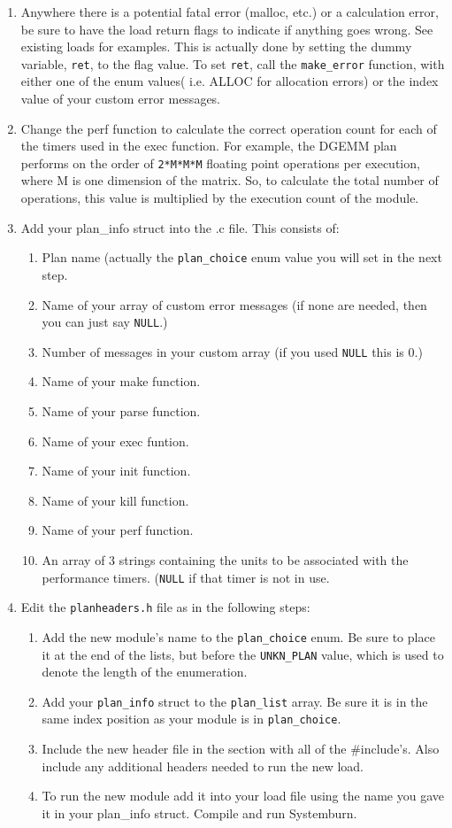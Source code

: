 \begin{enumerate}
        \item Anywhere there is a potential fatal error (malloc, etc.) or a calculation error, be sure to have the load return flags to indicate if anything goes wrong. See existing loads for examples. This is actually done by setting the dummy variable, \verb!ret!, to the flag value. To set \verb!ret!, call the \verb!make_error! function, with either one of the enum values( i.e. ALLOC for allocation errors) or the index value of your custom error messages.
	\item Change the perf function to calculate the correct operation count for each of the timers used in the exec function. For example, the DGEMM plan performs on the order of \verb!2*M*M*M! floating point operations per execution, where M is one dimension of the matrix. So, to calculate the total number of operations, this value is multiplied by the execution count of the module.
	\item Add your plan\_info struct into the .c file. This consists of:
		\begin{enumerate}
			\item Plan name (actually the \verb!plan_choice! enum value you will set in the next step.
			\item Name of your array of custom error messages (if none are needed, then you can just say \verb!NULL!.)
			\item Number of messages in your custom array (if you used \verb!NULL! this is 0.)
			\item Name of your make function.
			\item Name of your parse function.
			\item Name of your exec funtion.
			\item Name of your init function.
			\item Name of your kill function.
			\item Name of your perf function.
			\item An array of 3 strings containing the units to be associated with the performance timers. (\verb!NULL! if that timer is not in use.
		\end{enumerate}
        \item Edit the \verb!planheaders.h! file as in the following steps:
		\begin{enumerate} 
			\item Add the new module's name to the \verb!plan_choice! enum. Be sure to place it at the end of the lists, but before the \verb!UNKN_PLAN! value, which is used to denote the length of the enumeration.
			\item Add your \verb!plan_info! struct to the \verb!plan_list! array. Be sure it is in the same index position as your module is in \verb!plan_choice!.
			\item Include the new header file in the section with all of the \#include's. Also include any additional headers needed to run the new load.
		        \item To run the new module add it into your load file using the name you gave it in your plan\_info struct. Compile and run Systemburn.
		\end{enumerate}
\end{enumerate}
